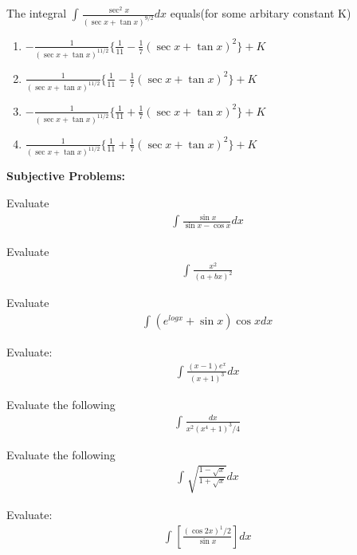 \item The integral $\int_{}\frac{\sec^{2}x}{(\sec x + \tan x)^{9/2}}dx$ equals(for some arbitary constant K)
\begin{enumerate}
\item $-\frac{1}{(\sec x + \tan x)^{11/2}}\{\frac{1}{11} - \frac{1}{7}(\sec x + \tan x)^2\} + K$
\item $\frac{1}{(\sec x + \tan x)^{11/2}}\{\frac{1}{11} - \frac{1}{7}(\sec x + \tan x)^2\} + K$
\item $-\frac{1}{(\sec x + \tan x)^{11/2}}\{\frac{1}{11} + \frac{1}{7}(\sec x + \tan x)^2\} + K$
\item $\frac{1}{(\sec x + \tan x)^{11/2}}\{\frac{1}{11} + \frac{1}{7}(\sec x + \tan x)^2\} + K$
\end{enumerate}

\textbf{Subjective Problems:}

\item Evaluate 
\begin{align*}
\int_{}\frac{\sin x}{\sin x - \cos x}dx
\end{align*}

\item Evaluate 
\begin{align*}
\int_{}\frac{x^2}{(a + bx)^2}
\end{align*}

\item Evaluate 
\begin{align*}
\int_{}(e^{log x} + \sin x)\cos x dx
\end{align*}

\item Evaluate: 
\begin{align*}
\int_{}\frac{(x - 1)e^x}{(x + 1)^3}dx
\end{align*}

\item Evaluate the following 
\begin{align*}
\int_{}\frac{dx}{x^2(x^4 + 1)^3/4}
\end{align*}

\item Evaluate the following 
\begin{align*}
\int_{}\sqrt{\frac{1 - \sqrt{x}}{1 + \sqrt{x}}}dx
\end{align*}

\item Evaluate: 
\begin{align*}
\int_{}[\frac{(\cos2x)^1/2}{\sin x}]dx
\end{align*}

